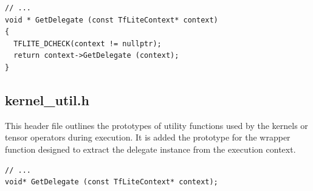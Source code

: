 \begin{lstlisting}
// ...
void * GetDelegate (const TfLiteContext* context)
{
  TFLITE_DCHECK(context != nullptr);
  return context->GetDelegate (context);
}
\end{lstlisting}

\subsection*{kernel\_util.h}
This header file outlines the prototypes of utility functions used by the kernels or tensor operators during execution. It is added the prototype for the wrapper function designed to extract the delegate instance from the execution context.
\begin{lstlisting}
// ...
void* GetDelegate (const TfLiteContext* context);
\end{lstlisting}

